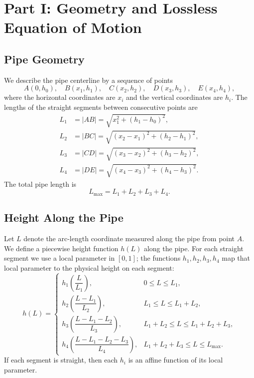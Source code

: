 \documentclass[11pt]{article}
\begin{document}
\section{Part I: Geometry and Lossless Equation of Motion}

\subsection{Pipe Geometry}

We describe the pipe centerline by a sequence of points
\[
A(0, h_0),\quad B(x_1, h_1),\quad C(x_2, h_2),\quad D(x_3, h_3),\quad E(x_4, h_4),
\]
where the horizontal coordinates are $x_i$ and the vertical coordinates are $h_i$.
The lengths of the straight segments between consecutive points are
\begin{align*}
L_1 &= \lvert AB \rvert = \sqrt{x_1^2 + (h_1 - h_0)^2}, \\
L_2 &= \lvert BC \rvert = \sqrt{(x_2 - x_1)^2 + (h_2 - h_1)^2}, \\
L_3 &= \lvert CD \rvert = \sqrt{(x_3 - x_2)^2 + (h_3 - h_2)^2}, \\
L_4 &= \lvert DE \rvert = \sqrt{(x_4 - x_3)^2 + (h_4 - h_3)^2}.
\end{align*}
The total pipe length is
\[
L_{\max} = L_1 + L_2 + L_3 + L_4.
\]

\subsection{Height Along the Pipe}

Let $L$ denote the arc-length coordinate measured along the pipe from point $A$.
We define a piecewise height function $h(L)$ along the pipe. For each straight
segment we use a local parameter in $[0, 1]$; the functions $h_1, h_2,
h_3, h_4$ map that local parameter to the physical height on each
segment:
\[
h(L) =
\begin{cases}
 h_1\!\left(\dfrac{L}{L_1}\right), & 0 \le L \le L_1, \\[1.0em]
 h_2\!\left(\dfrac{L - L_1}{L_2}\right), & L_1 \le L \le L_1 + L_2, \\[1.0em]
 h_3\!\left(\dfrac{L - L_1 - L_2}{L_3}\right), & L_1 + L_2 \le L \le L_1 + L_2 + L_3, \\[1.0em]
 h_4\!\left(\dfrac{L - L_1 - L_2 - L_3}{L_4}\right), & L_1 + L_2 + L_3 \le L \le L_{\max}.
\end{cases}
\]
If each segment is straight, then each $h_i$ is an affine function of its local
parameter.
\end{document}
